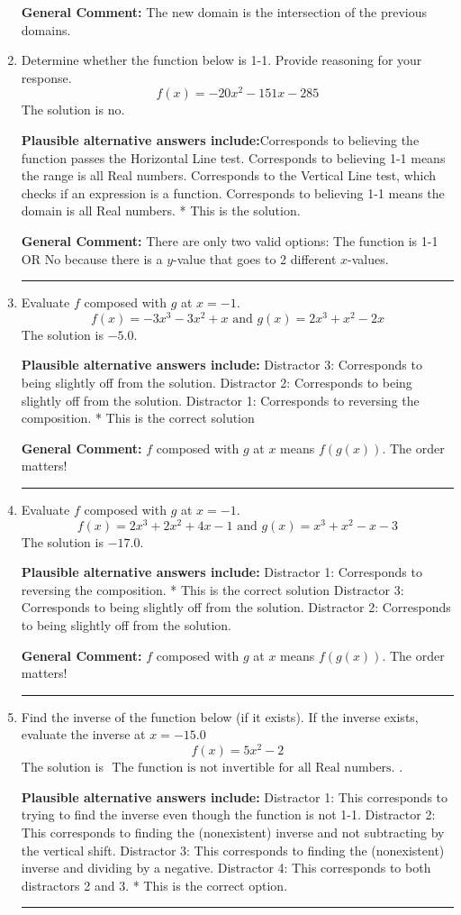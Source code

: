 \documentclass{extbook}[14pt]
\newcommand{\litem}[1]{\item #1

\rule{\textwidth}{0.4pt}}
\begin{document}
\begin{enumerate}
{\begin{enumerate}[label=\Alph*.]
\end{enumerate}

\textbf{General Comment:} The new domain is the intersection of the previous domains.
}
\litem{
Determine whether the function below is 1-1. Provide reasoning for your response.
\[ f(x) = -20 x^2 - 151 x - 285 \]The solution is \( \text{no} \).\begin{enumerate}[label=\Alph*.]
\textbf{Plausible alternative answers include:}Corresponds to believing the function passes the Horizontal Line test.
Corresponds to believing 1-1 means the range is all Real numbers.
Corresponds to the Vertical Line test, which checks if an expression is a function.
Corresponds to believing 1-1 means the domain is all Real numbers.
* This is the solution.
\end{enumerate}

\textbf{General Comment:} There are only two valid options: The function is 1-1 OR No because there is a $y$-value that goes to 2 different $x$-values.
}
\litem{
Evaluate $f$ composed with $g$ at $x=-1$.
\[ f(x) = -3x^{3} -3 x^{2} +x \text{ and } g(x) = 2x^{3} + x^{2} -2 x \]The solution is \( -5.0 \).\begin{enumerate}[label=\Alph*.]
\textbf{Plausible alternative answers include:} Distractor 3: Corresponds to being slightly off from the solution.
 Distractor 2: Corresponds to being slightly off from the solution.
 Distractor 1: Corresponds to reversing the composition.
* This is the correct solution

\end{enumerate}

\textbf{General Comment:} $f$ composed with $g$ at $x$ means $f(g(x))$. The order matters!
}
\litem{
Evaluate $f$ composed with $g$ at $x=-1$.
\[ f(x) = 2x^{3} +2 x^{2} +4 x -1 \text{ and } g(x) = x^{3} + x^{2} -x -3 \]The solution is \( -17.0 \).\begin{enumerate}[label=\Alph*.]
\textbf{Plausible alternative answers include:} Distractor 1: Corresponds to reversing the composition.
* This is the correct solution
 Distractor 3: Corresponds to being slightly off from the solution.
 Distractor 2: Corresponds to being slightly off from the solution.

\end{enumerate}

\textbf{General Comment:} $f$ composed with $g$ at $x$ means $f(g(x))$. The order matters!
}
\litem{
Find the inverse of the function below (if it exists). If the inverse exists, evaluate the inverse at $x = -15.0$
\[ f(x) = 5 x^2 - 2 \]The solution is \( \text{ The function is not invertible for all Real numbers. } \).\begin{enumerate}[label=\Alph*.]
\textbf{Plausible alternative answers include:} Distractor 1: This corresponds to trying to find the inverse even though the function is not 1-1. 
 Distractor 2: This corresponds to finding the (nonexistent) inverse and not subtracting by the vertical shift.
 Distractor 3: This corresponds to finding the (nonexistent) inverse and dividing by a negative.
 Distractor 4: This corresponds to both distractors 2 and 3.
* This is the correct option.
\end{enumerate}

}
\end{enumerate}
\end{document}
